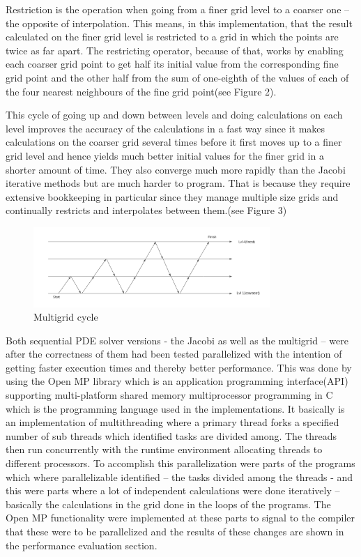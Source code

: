 \documentclass{article}
\begin{document}
Restriction is the operation when going from a finer grid level to a coarser one – the opposite of interpolation. This means, in this implementation, that the result calculated on the finer grid level is restricted to a grid in which the points are twice as far apart. The restricting operator, because of that, works by enabling each coarser grid point to get half its initial value from the corresponding fine grid point and the other half from the sum of one-eighth of the values of each of the four nearest neighbours of the fine grid point(see Figure 2). 

This cycle of going up and down between levels and doing calculations on each level improves the accuracy of the calculations in a fast way since it makes calculations on the coarser grid several times before it first moves up to a finer grid level and hence yields much better initial values for the finer grid in a shorter amount of time. They also converge much more rapidly than the Jacobi iterative methods but are much harder to program. That is because they require extensive bookkeeping in particular since they manage multiple size grids and continually restricts and interpolates between them.(see Figure 3)

\begin{figure}[h!]
    \centering
    \includegraphics[width=0.8\textwidth]{../images/multigridpattern.png}
    \caption{Multigrid cycle}
    \label{fig:basic}
\end{figure}
 \newpage
 
Both sequential PDE solver versions - the Jacobi as well as the multigrid – were after the correctness of them had been tested parallelized with the intention of getting faster execution times and thereby better performance. This was done by using the Open MP library which is an application programming interface(API) supporting multi-platform shared memory multiprocessor programming in C which is the programming language used in the implementations. It basically is an implementation of multithreading where a primary thread forks a specified number of sub threads which identified tasks are divided among. The threads then run concurrently with the runtime environment allocating threads to different processors. To accomplish this parallelization were parts of the programs which where parallelizable identified – the tasks divided among the threads - and this were parts where a lot of independent calculations were done iteratively – basically the calculations in the grid done in the loops of the programs. The Open MP functionality were implemented at these parts to signal to the compiler that these were to be parallelized and the results of these changes are shown in the performance evaluation section.
\end{document}
